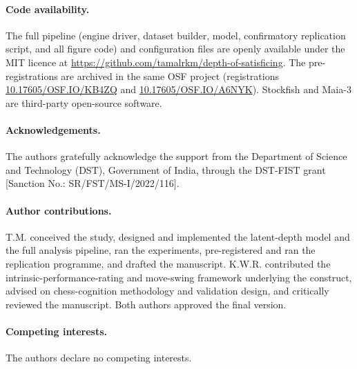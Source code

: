 \paragraph{Code availability.}
The full pipeline (engine driver, dataset builder, model, confirmatory replication script,
and all figure code) and configuration files are openly available under the MIT licence at
\url{https://github.com/tamalrkm/depth-of-satisficing}. The pre-registrations are archived in
the same OSF project (registrations
\href{https://doi.org/10.17605/OSF.IO/KB4ZQ}{10.17605/OSF.IO/KB4ZQ} and
\href{https://doi.org/10.17605/OSF.IO/A6NYK}{10.17605/OSF.IO/A6NYK}). Stockfish and Maia-3
are third-party open-source software.

\paragraph{Acknowledgements.}
The authors gratefully acknowledge the support from the Department of Science and Technology
(DST), Government of India, through the DST-FIST grant [Sanction No.: SR/FST/MS-I/2022/116].

\paragraph{Author contributions.}
T.M. conceived the study, designed and implemented the latent-depth model and the full
analysis pipeline, ran the experiments, pre-registered and ran the replication programme, and
drafted the manuscript. K.W.R. contributed the intrinsic-performance-rating and move-swing
framework underlying the construct, advised on chess-cognition methodology and validation
design, and critically reviewed the manuscript. Both authors approved the final version.

\paragraph{Competing interests.}
The authors declare no competing interests.


